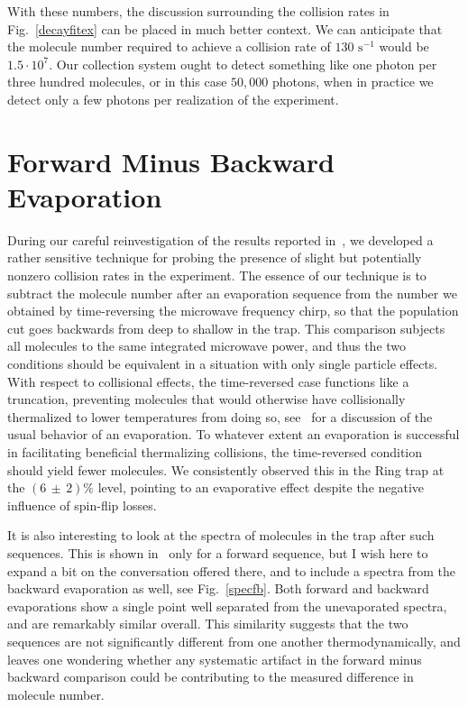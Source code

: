 With these numbers, the discussion surrounding the collision rates in Fig.~\ref{decayfitex} can be placed in much better context.
We can anticipate that the molecule number required to achieve a collision rate of $130\text{ s}^{-1}$ would be $1.5\cdot10^7$.
Our collection system ought to detect something like one photon per three hundred molecules, or in this case $50,000$ photons, when in practice we detect only a few photons per realization of the experiment.

\section{Forward Minus Backward Evaporation}

During our careful reinvestigation of the results reported in~\cite{Stuhl2012evap}, we developed a rather sensitive technique for probing the presence of slight but potentially nonzero collision rates in the experiment.
The essence of our technique is to subtract the molecule number after an evaporation sequence from the number we obtained by time-reversing the  microwave frequency chirp, so that the population cut goes backwards from deep to shallow in the trap.
This comparison subjects all molecules to the same integrated microwave power, and thus the two conditions should be equivalent in a situation with only single particle effects.
With respect to collisional effects, the time-reversed case functions like a truncation, preventing molecules that would otherwise have collisionally thermalized to lower temperatures from doing so, see~\cite{Luiten1996} for a discussion of the usual behavior of an evaporation.
To whatever extent an evaporation is successful in facilitating beneficial thermalizing collisions, the time-reversed condition should yield fewer molecules.
We consistently observed this in the Ring trap at the $(6\,{\pm}\,2)\%$ level, pointing to an evaporative effect despite the negative influence of spin-flip losses.

It is also interesting to look at the spectra of molecules in the trap after such sequences. 
This is shown in~\citep[App.~B]{Reens2017} only for a forward sequence, but I wish here to expand a bit on the conversation offered there, and to include a spectra from the backward evaporation as well, see Fig.~\ref{specfb}.
Both forward and backward evaporations show a single point well separated from the unevaporated spectra, and are remarkably similar overall.
This similarity suggests that the two sequences are not significantly different from one another thermodynamically, and leaves one wondering whether any systematic artifact in the forward minus backward comparison could be contributing to the measured difference in molecule number.

